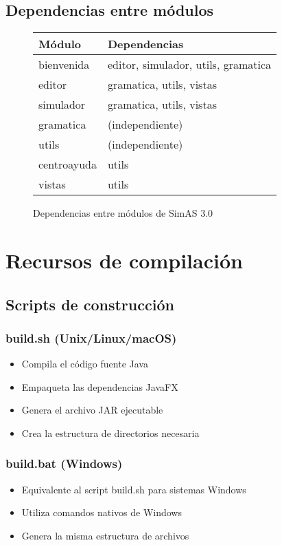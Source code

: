 \subsection{Dependencias entre módulos}

\begin{figure}[H]
\centering
\begin{tabular}{|l|l|}
\hline
\textbf{Módulo} & \textbf{Dependencias} \\
\hline
bienvenida & editor, simulador, utils, gramatica \\
\hline
editor & gramatica, utils, vistas \\
\hline
simulador & gramatica, utils, vistas \\
\hline
gramatica & (independiente) \\
\hline
utils & (independiente) \\
\hline
centroayuda & utils \\
\hline
vistas & utils \\
\hline
\end{tabular}
\caption{Dependencias entre módulos de SimAS 3.0}
\label{fig:dependencias-modulos}
\end{figure}

\section{Recursos de compilación}

\subsection{Scripts de construcción}

\subsubsection{build.sh (Unix/Linux/macOS)}
\begin{itemize}
    \item Compila el código fuente Java
    \item Empaqueta las dependencias JavaFX
    \item Genera el archivo JAR ejecutable
    \item Crea la estructura de directorios necesaria
\end{itemize}

\subsubsection{build.bat (Windows)}
\begin{itemize}
    \item Equivalente al script build.sh para sistemas Windows
    \item Utiliza comandos nativos de Windows
    \item Genera la misma estructura de archivos
\end{itemize}

